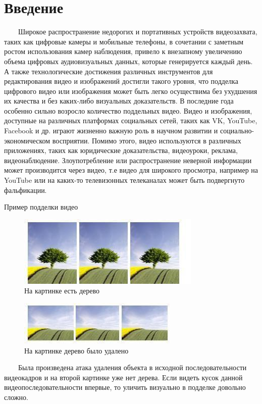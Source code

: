 \documentclass[12pt]{article}
\begin{document}
	\section{Введение}
	    $\qquad$Широкое распространение недорогих и портативных устройств видеозахвата, таких как цифровые камеры и мобильные телефоны, в сочетании с заметным ростом использования камер наблюдения, привело к внезапному увеличению объема цифровых аудиовизуальных данных, которые генерируется каждый день. А также технологические достижения различных инструментов для редактирования видео и изображений достигли такого уровня, что подделка цифрового видео или изображения может быть легко осуществима без ухудшения их качества и без каких-либо визуальных доказательств. В последние года особенно сильно возросло количество поддельных видео. Видео и изображения, доступные на различных платформах социальных сетей, таких как VK, YouTube, Facebook и др. играют жизненно важную роль в научном развитии и социально-экономическом восприятии. Помимо этого, видео используются в различных приложениях, таких как юридические доказательства, видеоуроки, реклама, видеонаблюдение. Злоупотребление или распространение неверной информации может производится через видео, т.е видео для широкого просмотра, например на YouTube или на каких-то телевизонных телеканалах может быть подвергнуто фальфикации. 
	    \newline
	    \centerline{Пример подделки видео}
	    \begin{figure}[h!]
	        \centering
	        \includegraphics[width = 210 pt]{1.jpg}
	        \caption{На картинке есть дерево}
	    \end{figure}
	    \begin{figure}[h!]
	        \centering
	        \includegraphics[width = 200 pt]{2.jpg}
	        \caption{На картинке дерево было удалено}
	    \end{figure}
	   \newline
	   $\qquad$Была произведена атака удаления объекта в исходной последовательности видеокадров и на второй картинке уже нет дерева. Если видеть кусок данной видеопоследовательности впервые, то уличить визуально в подделке довольно сложно. 
	   
\end{document}
